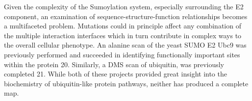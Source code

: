 Given the complexity of the Sumoylation system, especially surrounding the E2 component, an examination of sequence-structure-function relationships becomes a multifaceted problem. Mutations could in principle affect any combination of the multiple interaction interfaces which in turn contribute in complex ways to the overall cellular phenotype.
An alanine scan of the yeast SUMO E2 Ubc9 was previously performed and succeeded in identifying functionally important sites within the protein 20. Similarly, a DMS scan of ubiquitin, was previously completed 21. While both of these projects provided great insight into the biochemistry of ubiquitin-like protein pathways, neither has produced a complete map.
